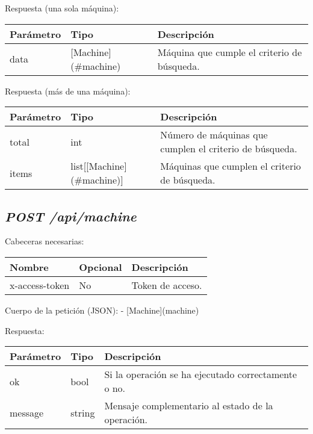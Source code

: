 Respuesta (una sola máquina):
\begin{table}[h!]
	\centering
	\begin{adjustbox}{max width=\textwidth}
	\begin{tabular}{|l|l|l|}
		\hline
		Parámetro & Tipo & Descripción \\ \hline
		data & [Machine](\#machine) & Máquina que cumple el criterio de búsqueda. \\ \hline
	\end{tabular}
\end{adjustbox}
\end{table}

Respuesta (más de una máquina):
\begin{table}[h!]
	\centering
	\begin{adjustbox}{max width=\textwidth}
	\begin{tabular}{|l|l|l|}
		\hline
		Parámetro & Tipo & Descripción \\ \hline
		total & int & Número de máquinas que cumplen el criterio de búsqueda. \\ \hline
		items & list[[Machine](\#machine)] & Máquinas que cumplen el criterio de búsqueda. \\ \hline
	\end{tabular}
\end{adjustbox}
\end{table}



\subsection{\textit{POST /api/machine}}

Cabeceras necesarias:
\begin{table}[h!]
	\centering
	\begin{adjustbox}{max width=\textwidth}
	\begin{tabular}{|l|l|l|}
		\hline
		Nombre & Opcional & Descripción \\ \hline
		x-access-token & No & Token de acceso. \\ \hline
	\end{tabular}
\end{adjustbox}
\end{table}

Cuerpo de la petición (JSON):
- [Machine](machine)

Respuesta:
\begin{table}[!h]
	\centering
	\begin{adjustbox}{max width=\textwidth}
	\begin{tabular}{|l|l|l|}
		\hline
		Parámetro & Tipo & Descripción \\ \hline
		ok & bool & Si la operación se ha ejecutado correctamente o no. \\ \hline
		message & string & Mensaje complementario al estado de la operación. \\ \hline
	\end{tabular}
\end{adjustbox}
\end{table}


